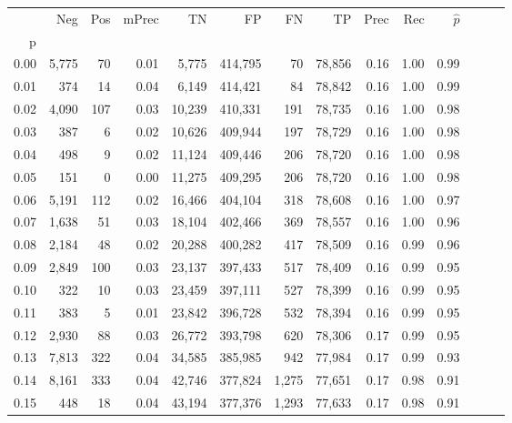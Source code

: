 \begin{tabular}{rrrrrrrrrrrrrr}
\toprule
{} &     Neg &    Pos & mPrec &       TN &       FP &      FN &      TP &  Prec &   Rec & $\hat{p}$ \\
p    &         &        &       &          &          &         &         &       &       &           \\
\midrule
0.00 &   5,775 &     70 &  0.01 &    5,775 &  414,795 &      70 &  78,856 &  0.16 &  1.00 &      0.99 \\
0.01 &     374 &     14 &  0.04 &    6,149 &  414,421 &      84 &  78,842 &  0.16 &  1.00 &      0.99 \\
0.02 &   4,090 &    107 &  0.03 &   10,239 &  410,331 &     191 &  78,735 &  0.16 &  1.00 &      0.98 \\
0.03 &     387 &      6 &  0.02 &   10,626 &  409,944 &     197 &  78,729 &  0.16 &  1.00 &      0.98 \\
0.04 &     498 &      9 &  0.02 &   11,124 &  409,446 &     206 &  78,720 &  0.16 &  1.00 &      0.98 \\
0.05 &     151 &      0 &  0.00 &   11,275 &  409,295 &     206 &  78,720 &  0.16 &  1.00 &      0.98 \\
0.06 &   5,191 &    112 &  0.02 &   16,466 &  404,104 &     318 &  78,608 &  0.16 &  1.00 &      0.97 \\
0.07 &   1,638 &     51 &  0.03 &   18,104 &  402,466 &     369 &  78,557 &  0.16 &  1.00 &      0.96 \\
0.08 &   2,184 &     48 &  0.02 &   20,288 &  400,282 &     417 &  78,509 &  0.16 &  0.99 &      0.96 \\
0.09 &   2,849 &    100 &  0.03 &   23,137 &  397,433 &     517 &  78,409 &  0.16 &  0.99 &      0.95 \\
0.10 &     322 &     10 &  0.03 &   23,459 &  397,111 &     527 &  78,399 &  0.16 &  0.99 &      0.95 \\
0.11 &     383 &      5 &  0.01 &   23,842 &  396,728 &     532 &  78,394 &  0.16 &  0.99 &      0.95 \\
0.12 &   2,930 &     88 &  0.03 &   26,772 &  393,798 &     620 &  78,306 &  0.17 &  0.99 &      0.95 \\
0.13 &   7,813 &    322 &  0.04 &   34,585 &  385,985 &     942 &  77,984 &  0.17 &  0.99 &      0.93 \\
0.14 &   8,161 &    333 &  0.04 &   42,746 &  377,824 &   1,275 &  77,651 &  0.17 &  0.98 &      0.91 \\
0.15 &     448 &     18 &  0.04 &   43,194 &  377,376 &   1,293 &  77,633 &  0.17 &  0.98 &      0.91 \\

\end{tabular}
